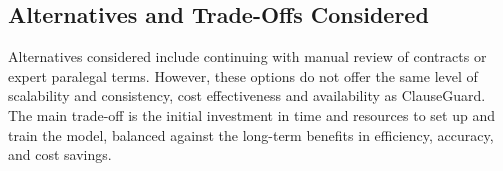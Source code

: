 \begin{itemize}
\begin{itemize}
        \end{itemize}
    \subsection{Alternatives and Trade-Offs Considered}
    Alternatives considered include continuing with manual review of contracts or expert paralegal terms. However, these options do not offer the same level of scalability and consistency, cost effectiveness and availability as ClauseGuard. The main trade-off is the initial investment in time and resources to set up and train the model, balanced against the long-term benefits in efficiency, accuracy, and cost savings.





        
\end{itemize}


